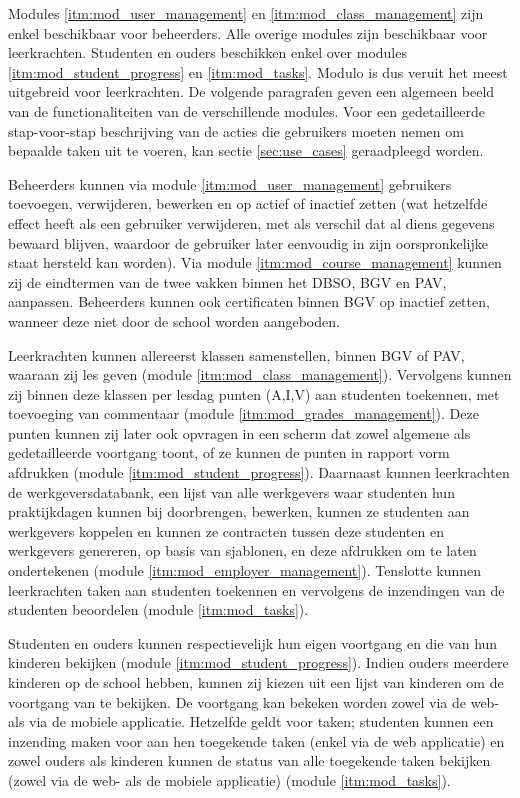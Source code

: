 \documentclass[a4paper]{article}
\begin{document}
Modules \ref{itm:mod_user_management} en \ref{itm:mod_class_management} zijn enkel beschikbaar voor beheerders. Alle overige modules zijn beschikbaar voor leerkrachten. Studenten en ouders beschikken enkel over modules \ref{itm:mod_student_progress} en \ref{itm:mod_tasks}. Modulo is dus veruit het meest uitgebreid voor leerkrachten. De volgende paragrafen geven een algemeen beeld van de functionaliteiten van de verschillende modules. Voor een gedetailleerde stap-voor-stap beschrijving van de acties die gebruikers moeten nemen om bepaalde taken uit te voeren, kan sectie \ref{sec:use_cases} geraadpleegd worden.

\newpage
Beheerders kunnen via module \ref{itm:mod_user_management} gebruikers toevoegen, verwijderen, bewerken en op actief of inactief zetten (wat hetzelfde effect heeft als een gebruiker verwijderen, met als verschil dat al diens gegevens bewaard blijven, waardoor de gebruiker later eenvoudig in zijn oorspronkelijke staat hersteld kan worden). Via module \ref{itm:mod_course_management} kunnen zij de eindtermen van de twee vakken binnen het DBSO, BGV en PAV, aanpassen. Beheerders kunnen ook certificaten binnen BGV op inactief zetten, wanneer deze niet door de school worden aangeboden.

Leerkrachten kunnen allereerst klassen samenstellen, binnen BGV of PAV, waaraan zij les geven (module \ref{itm:mod_class_management}). Vervolgens kunnen zij binnen deze klassen per lesdag punten (A,I,V) aan studenten toekennen, met toevoeging van commentaar (module \ref{itm:mod_grades_management}). Deze punten kunnen zij later ook opvragen in een scherm dat zowel algemene als gedetailleerde voortgang toont, of ze kunnen de punten in rapport vorm afdrukken (module \ref{itm:mod_student_progress}). Daarnaast kunnen leerkrachten de werkgeversdatabank, een lijst van alle werkgevers waar studenten hun praktijkdagen kunnen bij doorbrengen, bewerken, kunnen ze studenten aan werkgevers koppelen en kunnen ze contracten tussen deze studenten en werkgevers genereren, op basis van sjablonen, en deze afdrukken om te laten ondertekenen (module \ref{itm:mod_employer_management}). Tenslotte kunnen leerkrachten taken aan studenten toekennen en vervolgens de inzendingen van de studenten beoordelen (module \ref{itm:mod_tasks}).

Studenten en ouders kunnen respectievelijk hun eigen voortgang en die van hun kinderen bekijken (module \ref{itm:mod_student_progress}). Indien ouders meerdere kinderen op de school hebben, kunnen zij kiezen uit een lijst van kinderen om de voortgang van te bekijken. De voortgang kan bekeken worden zowel via de web- als via de mobiele applicatie. Hetzelfde geldt voor taken; studenten kunnen een inzending maken voor aan hen toegekende taken (enkel via de web applicatie) en zowel ouders als kinderen kunnen de status van alle toegekende taken bekijken (zowel via de web- als de mobiele applicatie) (module \ref{itm:mod_tasks}).
\end{document}
